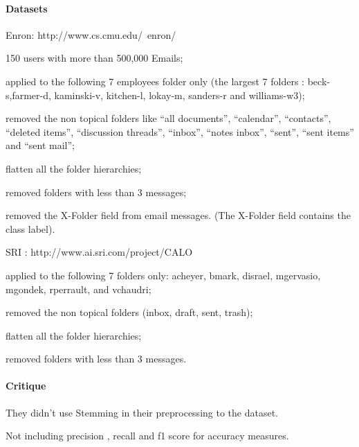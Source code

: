 \documentclass[12pt]{article}
\newenvironment{my_itemize}
{\begin{itemize}
  \setlength{\itemsep}{0cm}
  \setlength{\parskip}{0cm}}
{\end{itemize}}
\begin{document}
\paragraph{Datasets}
    \begin{my_itemize}
    \item Enron: http://www.cs.cmu.edu/~enron/
    \begin{my_itemize}
        \item 150 users with more than 500,000 Emails;
        \item applied to the following 7 employees folder only 
	      (the largest 7 folders : beck-s,farmer-d, kaminski-v, 
	      kitchen-l, lokay-m, sanders-r and williams-w3);
        \item removed the non topical folders like ``all documents'', 
	      ``calendar'', ``contacts'', ``deleted items'', ``discussion threads'', 
	      ``inbox'', ``notes inbox'', ``sent'', ``sent items'' and ``sent mail'';
        \item flatten all the folder hierarchies;
        \item removed folders with less than 3 messages;
        \item removed the X-Folder field from email messages. (The X-Folder 
	      field contains the class label).
    \end{my_itemize}
    \item SRI : http://www.ai.sri.com/project/CALO
    \begin{my_itemize}
        \item applied to the following 7 folders only: acheyer, bmark, disrael, 
	      mgervasio, mgondek, rperrault, and vchaudri;
        \item removed the non topical folders (inbox, draft, sent, trash);
        \item flatten all the folder hierarchies;
        \item removed folders with less than 3 messages.
    \end{my_itemize}
\end{my_itemize}

\paragraph{Critique}
\begin{my_itemize}
    \item They didn’t use Stemming in their preprocessing to the dataset.
    \item Not including precision , recall and f1 score for accuracy measures.
\end{my_itemize}
\end{document}
